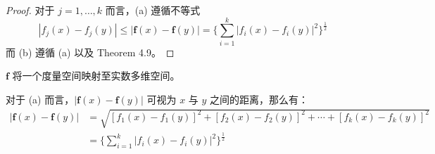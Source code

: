\documentclass[../poma-notes.tex]{subfiles}
\begin{document}
\begin{proof}
  对于 $j = 1,\dots,k$ 而言，(a) 遵循不等式
  \[
    |f_j(x) - f_j(y)| \le |\mathbf{f}(x) - \mathbf{f}(y)| =
    \biggl\{ \sum_{i=1}^k |f_i(x) - f_i(y)|^2 \biggr\}^{\frac{1}{2}}
  \]
  而 (b) 遵循 (a) 以及 Theorem 4.9。
\end{proof}

\begin{anote}
  $\mathbf{f}$ 将一个度量空间映射至实数多维空间。

  对于 (a) 而言，$|\mathbf{f}(x) - \mathbf{f}(y)|$ 可视为 $x$ 与 $y$ 之间的距离，那么有：
  \begin{align*}
    |\mathbf{f}(x) - \mathbf{f}(y)| & = \sqrt{[f_1(x) - f_1(y)]^2 + [f_2(x) - f_2(y)]^2 + \cdots +
    [f_k(x) - f_k(y)]^2}                                                                                   \\
                                    & = \biggl\{ \sum_{i=1}^{k} |f_i(x) - f_i(y)|^2 \biggr\}^{\frac{1}{2}}
  \end{align*}
\end{anote}
\end{document}
